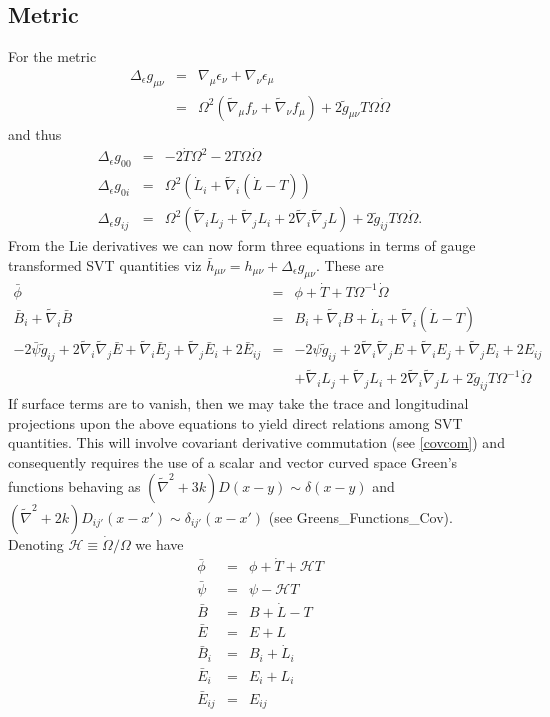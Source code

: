 \documentclass[10pt,letterpaper]{article}
\numberwithin{equation}{section}
\begin{document}
\subsection{Metric}
For the metric
\begin{eqnarray}
\Delta_\epsilon g_{\mu\nu} &=& \nabla_\mu \epsilon_\nu + \nabla_\nu \epsilon_\mu
\nonumber\\
&=& \Omega^2(\tilde\nabla_\mu f_\nu + \tilde\nabla_\nu f_\mu) + 2\tilde g_{\mu\nu}T \Omega \dot\Omega
\end{eqnarray}
and thus
\begin{eqnarray}
\Delta_\epsilon g_{00} &=& -2 \dot T\Omega^2 - 2 T\Omega \dot \Omega
\nonumber\\
\Delta_\epsilon g_{0i}&=& \Omega^2(\dot L_i + \tilde\nabla_i (\dot L - T) )
\nonumber\\
\Delta_\epsilon g_{ij}&=& \Omega^2(\tilde\nabla_i L_j + \tilde\nabla_j L_i + 2\tilde\nabla_i\tilde\nabla_j L) + 2\tilde g_{ij}T \Omega \dot\Omega.
\label{liemetric}
\end{eqnarray}
From the Lie derivatives we can now form three equations in terms of gauge transformed SVT quantities viz $\bar h_{\mu\nu} = h_{\mu\nu} + \Delta_\epsilon g_{\mu\nu}$. These are
\begin{eqnarray}
\bar \phi &=& \phi  + \dot T + T \Omega^{-1} \dot\Omega
\nonumber\\
\bar B_i + \tilde\nabla_i \bar B &=& B_i + \tilde\nabla_i B + \dot L_i + \tilde\nabla_i (\dot L - T) 
\nonumber\\
-2\bar \psi \tilde g_{ij} + 2\tilde\nabla_i \tilde\nabla_j \bar E + \tilde \nabla_i \bar E_j + \tilde\nabla_j \bar E_i +2\bar E_{ij} &=&-2 \psi \tilde g_{ij} + 2\tilde\nabla_i \tilde\nabla_j E + \tilde \nabla_i  E_j + \tilde\nabla_j  E_i +2 E_{ij}
\nonumber\\
&&+ \tilde\nabla_i L_j + \tilde\nabla_j L_i + 2\tilde\nabla_i\tilde\nabla_j L + 2\tilde g_{ij}T \Omega^{-1} \dot\Omega
\end{eqnarray}
If surface terms are to vanish, then we may take the trace and longitudinal projections upon the above equations to yield direct relations among SVT quantities. This will involve covariant derivative commutation (see \eqref{covcom}) and consequently requires the use of a scalar and vector curved space Green's functions behaving as $(\tilde\nabla^2 + 3k)D(x-y) \sim \delta(x-y)$ and $(\tilde\nabla^2+2k) D_{ij'}(x-x')\sim \delta_{ij'}(x-x')$ (see Greens\_Functions\_Cov). Denoting $\mathcal H \equiv \dot\Omega/\Omega$ we have
\begin{eqnarray}
\bar \phi &=& \phi  + \dot T + \mathcal H T
\nonumber\\
\bar \psi &=& \psi  - \mathcal H T
\nonumber\\
\bar B &=& B + \dot L - T
\nonumber\\
\bar E &=& E + L
\nonumber\\
\bar B_i &=& B_i + \dot L_i
\nonumber\\
\bar E_i &=& E_i + L_i
\nonumber\\
\bar E_{ij} &=& E_{ij}
\end{eqnarray}
\end{document}
